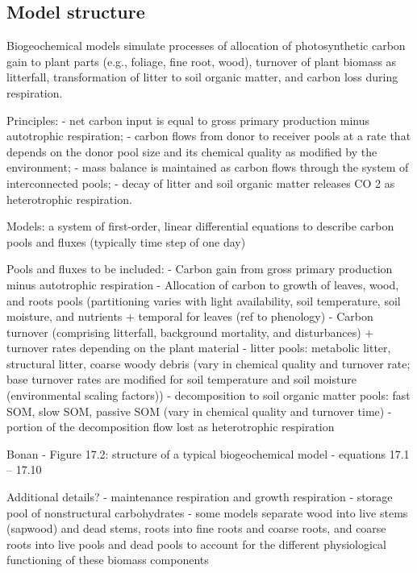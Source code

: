 \documentclass[
  oneside]{book}
\begin{document}
\hypertarget{model-structure}{%
\subsection{Model structure}\label{model-structure}}

Biogeochemical models simulate processes of allocation of photosynthetic carbon gain to plant parts (e.g., foliage, fine root, wood), turnover of plant biomass as litterfall, transformation of litter to soil organic matter, and carbon loss during respiration.

Principles:
- net carbon input is equal to gross primary production minus autotrophic respiration;
- carbon flows from donor to receiver pools at a rate that depends on the donor pool size and its chemical quality as modified by the environment;
- mass balance is maintained as carbon flows through the system of interconnected pools;
- decay of litter and soil organic matter releases CO 2 as heterotrophic respiration.

Models:
a system of first-order, linear differential equations to describe carbon pools and fluxes (typically time step of one day)

Pools and fluxes to be included:
- Carbon gain from gross primary production minus autotrophic respiration
- Allocation of carbon to growth of leaves, wood, and roots pools (partitioning varies with light availability, soil temperature, soil moisture, and nutrients + temporal for leaves (ref to phenology)
- Carbon turnover (comprising litterfall, background mortality, and disturbances) + turnover rates depending on the plant material
- litter pools: metabolic litter, structural litter, coarse woody debris (vary in chemical quality and turnover rate; base turnover rates are modified for soil temperature and soil moisture (environmental scaling factors))
- decomposition to soil organic matter pools: fast SOM, slow SOM, passive SOM (vary in chemical quality and turnover time)
- portion of the decomposition flow lost as heterotrophic respiration

Bonan
- Figure 17.2: structure of a typical biogeochemical model
- equations 17.1 -- 17.10

Additional details?
- maintenance respiration and growth respiration
- storage pool of nonstructural carbohydrates
- some models separate wood into live stems (sapwood) and dead stems, roots into fine roots and coarse roots, and coarse roots into live pools and dead pools to account for the different physiological functioning of these biomass components
\end{document}
